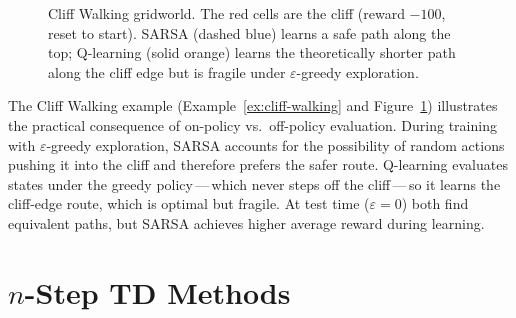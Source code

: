 \begin{figure}[ht]
\centering
{}
\caption{Cliff Walking gridworld.  The red cells are the cliff (reward $-100$, reset to start).  SARSA (dashed blue) learns a safe path along the top; Q-learning (solid orange) learns the theoretically shorter path along the cliff edge but is fragile under $\varepsilon$-greedy exploration.}
\label{fig:cliff-walking}
\end{figure}

The Cliff Walking example (Example~\ref{ex:cliff-walking} and Figure~\ref{fig:cliff-walking}) illustrates the practical consequence of on-policy vs.\ off-policy evaluation.  During training with $\varepsilon$-greedy exploration, SARSA accounts for the possibility of random actions pushing it into the cliff and therefore prefers the safer route.  Q-learning evaluates states under the greedy policy\,---\,which never steps off the cliff\,---\,so it learns the cliff-edge route, which is optimal but fragile.  At test time ($\varepsilon=0$) both find equivalent paths, but SARSA achieves higher average reward during learning.

\section{$n$-Step TD Methods}
\label{sec:nstep-td}

